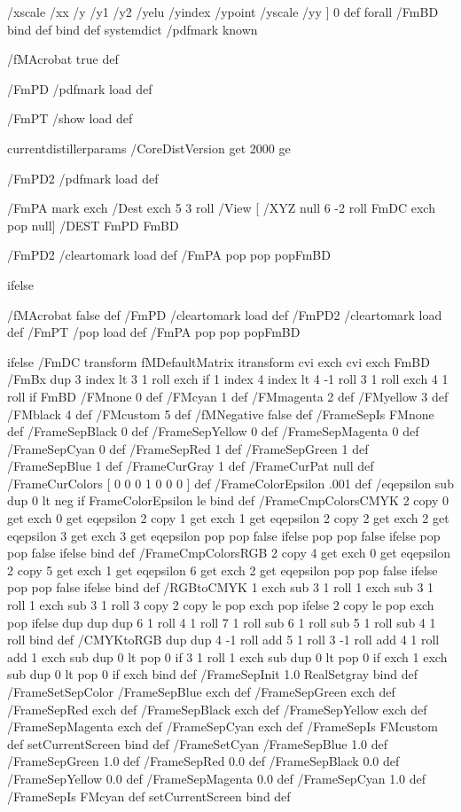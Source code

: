 	/xscale
	/xx
	/y
	/y1
	/y2
	/yelu
	/yindex
	/ypoint
	/yscale
	/yy
] { 0 def } forall
/FmBD {bind def} bind def
systemdict /pdfmark known {
	/fMAcrobat true def
	
	/FmPD /pdfmark load def
	
	
	/FmPT /show load def
	
	
	currentdistillerparams /CoreDistVersion get 2000 ge {
	
		
		/FmPD2 /pdfmark load def
		
		
		
		
		
		/FmPA { mark exch /Dest exch 5 3 roll 
				/View [ /XYZ null 6 -2 roll FmDC exch pop null] /DEST FmPD 
		}FmBD
	} {
		
		/FmPD2 /cleartomark load def
		/FmPA {pop pop pop}FmBD
	} ifelse
} {
	
	/fMAcrobat false def
	/FmPD /cleartomark load def
	/FmPD2 /cleartomark load def
	/FmPT /pop load def
	/FmPA {pop pop pop}FmBD
} ifelse
/FmDC {
	transform fMDefaultMatrix itransform cvi exch cvi exch
}FmBD
/FmBx {
	dup 3 index lt {3 1 roll exch} if 
	1 index 4 index lt {4 -1 roll 3 1 roll exch 4 1 roll} if
}FmBD
/FMnone 0 def
/FMcyan 1 def
/FMmagenta 2 def
/FMyellow 3 def
/FMblack 4 def
/FMcustom 5 def
/fMNegative false def 
/FrameSepIs FMnone def 
/FrameSepBlack 0 def
/FrameSepYellow 0 def
/FrameSepMagenta 0 def
/FrameSepCyan 0 def
/FrameSepRed 1 def
/FrameSepGreen 1 def
/FrameSepBlue 1 def
/FrameCurGray 1 def
/FrameCurPat null def
/FrameCurColors [ 0 0 0 1 0 0 0 ] def 
/FrameColorEpsilon .001 def	
/eqepsilon {		
	sub dup 0 lt {neg} if
	FrameColorEpsilon le
} bind def
/FrameCmpColorsCMYK { 
	2 copy 0 get exch 0 get eqepsilon {
		2 copy 1 get exch 1 get eqepsilon {
			2 copy 2 get exch 2 get eqepsilon {
				3 get exch 3 get eqepsilon
			} {pop pop false} ifelse
		}{pop pop false} ifelse
	} {pop pop false} ifelse
} bind def
/FrameCmpColorsRGB { 
	2 copy 4 get exch 0 get eqepsilon {
		2 copy 5 get exch 1 get eqepsilon {
			6 get exch 2 get eqepsilon
		}{pop pop false} ifelse
	} {pop pop false} ifelse
} bind def
/RGBtoCMYK { 
	1 exch sub 
	3 1 roll 
	1 exch sub 
	3 1 roll 
	1 exch sub 
	3 1 roll 
	3 copy 
	2 copy 
	le { pop } { exch pop } ifelse 
	2 copy 
	le { pop } { exch pop } ifelse 
	dup dup dup 
	6 1 roll 
	4 1 roll 
	7 1 roll 
	sub 
	6 1 roll 
	sub 
	5 1 roll 
	sub 
	4 1 roll 
} bind def
/CMYKtoRGB { 
	dup dup 4 -1 roll add 						  
	5 1 roll 3 -1 roll add 						  
	4 1 roll add 								  
	1 exch sub dup 0 lt {pop 0} if 3 1 roll 	  
	1 exch sub dup 0 lt {pop 0} if exch 	      
	1 exch sub dup 0 lt {pop 0} if exch	  		  
} bind def
/FrameSepInit {
	1.0 RealSetgray
} bind def
/FrameSetSepColor { 
	/FrameSepBlue exch def
	/FrameSepGreen exch def
	/FrameSepRed exch def
	/FrameSepBlack exch def
	/FrameSepYellow exch def
	/FrameSepMagenta exch def
	/FrameSepCyan exch def
	/FrameSepIs FMcustom def
	setCurrentScreen	
} bind def
/FrameSetCyan {
	/FrameSepBlue 1.0 def
	/FrameSepGreen 1.0 def
	/FrameSepRed 0.0 def
	/FrameSepBlack 0.0 def
	/FrameSepYellow 0.0 def
	/FrameSepMagenta 0.0 def
	/FrameSepCyan 1.0 def
	/FrameSepIs FMcyan def
	setCurrentScreen	
} bind def
 
